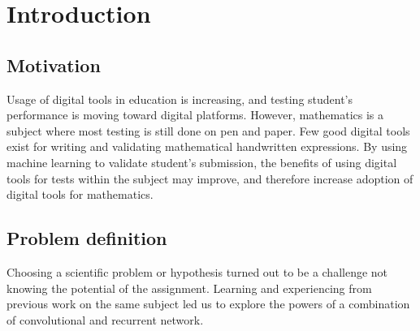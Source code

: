 \chapter{Introduction}

\section{Motivation} %

Usage of digital tools in education is increasing, and testing student's performance is moving toward digital platforms. However, mathematics is a subject where most testing is still done on pen and paper. Few good digital tools exist for writing and validating mathematical handwritten expressions. By using machine learning to validate student's submission, the benefits of using digital tools for tests within the subject may improve, and therefore increase adoption of digital tools for mathematics.






\section{Problem definition} 
\label{problem_definition}

Choosing a scientific problem or hypothesis turned out to be a challenge not knowing the potential of the assignment. Learning and experiencing from previous work on the same subject led us to explore the powers of a combination of convolutional and recurrent network.

